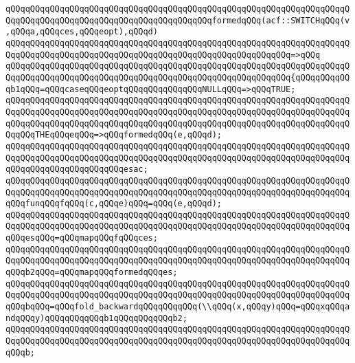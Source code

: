 \newline
\verb|qQQqqQQqqQQqqQQqqQQqqQQqqQQqqQQqqQQqqQQqqQQqqQQqqQQqqQQqqQQqqQQqqQQqqQQqqQQqqQQqqQQqqQQqqQQqqQQqqQQqqQQqqQQqqQQqformedqQQq(acf::SWITCHqQQq(v,qQQqa,qQQqces,qQQqeopt),qQQqd)|\newline
\verb|qQQqqQQqqQQqqQQqqQQqqQQqqQQqqQQqqQQqqQQqqQQqqQQqqQQqqQQqqQQqqQQqqQQqqQQqqQQqqQQqqQQqqQQqqQQqqQQqqQQqqQQqqQQqqQQqqQQqqQQqqQQqqQQq=>qQQq|\newline
\verb|qQQqqQQqqQQqqQQqqQQqqQQqqQQqqQQqqQQqqQQqqQQqqQQqqQQqqQQqqQQqqQQqqQQqqQQqqQQqqQQqqQQqqQQqqQQqqQQqqQQqqQQqqQQqqQQqqQQqqQQqqQQqqQQq{qQQqqQQqqQQqb1qQQq=qQQqcaseqQQqeoptqQQqqQQqqQQqqQQqNULLqQQq=>qQQqTRUE;|\newline
\verb|qQQqqQQqqQQqqQQqqQQqqQQqqQQqqQQqqQQqqQQqqQQqqQQqqQQqqQQqqQQqqQQqqQQqqQQqqQQqqQQqqQQqqQQqqQQqqQQqqQQqqQQqqQQqqQQqqQQqqQQqqQQqqQQqqQQqqQQqqQQqqQQqqQQqqQQqqQQqqQQqqQQqqQQqqQQqqQQqqQQqqQQqqQQqqQQqqQQqqQQqqQQqqQQqqQQqqQQqTHEqQQqeqQQq=>qQQqformedqQQq(e,qQQqd);|\newline
\verb|qQQqqQQqqQQqqQQqqQQqqQQqqQQqqQQqqQQqqQQqqQQqqQQqqQQqqQQqqQQqqQQqqQQqqQQqqQQqqQQqqQQqqQQqqQQqqQQqqQQqqQQqqQQqqQQqqQQqqQQqqQQqqQQqqQQqqQQqqQQqqQQqqQQqqQQqqQQqqQQqqQQqesac;|\newline
\newline
\verb|qQQqqQQqqQQqqQQqqQQqqQQqqQQqqQQqqQQqqQQqqQQqqQQqqQQqqQQqqQQqqQQqqQQqqQQqqQQqqQQqqQQqqQQqqQQqqQQqqQQqqQQqqQQqqQQqqQQqqQQqqQQqqQQqqQQqqQQqqQQqqQQqfunqQQqfqQQq(c,qQQqe)qQQq=qQQq(e,qQQqd);|\newline
\newline
\verb|qQQqqQQqqQQqqQQqqQQqqQQqqQQqqQQqqQQqqQQqqQQqqQQqqQQqqQQqqQQqqQQqqQQqqQQqqQQqqQQqqQQqqQQqqQQqqQQqqQQqqQQqqQQqqQQqqQQqqQQqqQQqqQQqqQQqqQQqqQQqqQQqesqQQq=qQQqmapqQQqfqQQqces;|\newline
\verb|qQQqqQQqqQQqqQQqqQQqqQQqqQQqqQQqqQQqqQQqqQQqqQQqqQQqqQQqqQQqqQQqqQQqqQQqqQQqqQQqqQQqqQQqqQQqqQQqqQQqqQQqqQQqqQQqqQQqqQQqqQQqqQQqqQQqqQQqqQQqqQQqb2qQQq=qQQqmapqQQqformedqQQqes;|\newline
\newline
\verb|qQQqqQQqqQQqqQQqqQQqqQQqqQQqqQQqqQQqqQQqqQQqqQQqqQQqqQQqqQQqqQQqqQQqqQQqqQQqqQQqqQQqqQQqqQQqqQQqqQQqqQQqqQQqqQQqqQQqqQQqqQQqqQQqqQQqqQQqqQQqqQQqbqQQq=qQQqfold_backwardqQQqqQQqqQQq(\\qQQq(x,qQQqy)qQQq=qQQqxqQQqandqQQqy)qQQqqQQqqQQqb1qQQqqQQqqQQqb2;|\newline
\newline
\verb|qQQqqQQqqQQqqQQqqQQqqQQqqQQqqQQqqQQqqQQqqQQqqQQqqQQqqQQqqQQqqQQqqQQqqQQqqQQqqQQqqQQqqQQqqQQqqQQqqQQqqQQqqQQqqQQqqQQqqQQqqQQqqQQqqQQqqQQqqQQqqQQqb;|\newline
